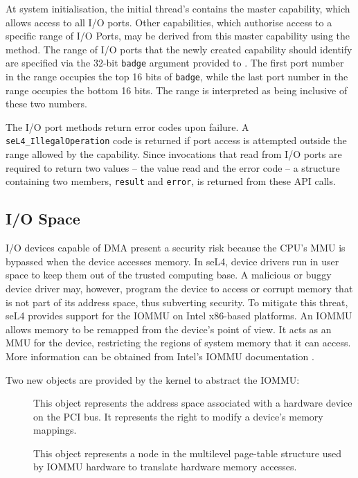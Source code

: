 At system initialisation, the initial thread's  contains the
master  capability, which allows access to all I/O ports.
Other  capabilities, which authorise access to a specific
range of I/O Ports, may be derived from this master capability using
the  method. 
The range of I/O ports that the newly created capability should identify
are specified via the 32-bit \texttt{badge} argument provided to 
. The first port number in the range
occupies the top 16 bits of \texttt{badge}, while the last port number in
the range occupies the bottom 16 bits. The range is interpreted as being
inclusive of these two numbers.

The I/O port methods return error codes upon failure.
A \texttt{seL4\_IllegalOperation} code is returned if port access is
attempted outside the range allowed by the  capability. 
Since invocations that
read from I/O ports are required to return two values -- the value read
and the error code -- a structure containing two members, \texttt{result}
and \texttt{error}, is returned from these API calls.

\subsection{I/O Space}
\label{sec:iospace}

I/O devices capable of DMA present a security risk because the CPU's MMU
is bypassed when the device accesses memory. In seL4, device drivers run
in user space to keep them out of the trusted computing base.
A malicious or buggy device driver may, however, program the device to
access or corrupt memory that is not part of its address space, thus
subverting security. To mitigate this threat, seL4 provides support for
the IOMMU on Intel x86-based platforms. An IOMMU allows memory to be
remapped from the device's point of view. It acts as an MMU for the
device, restricting the regions of system memory that it can access.
More information can be obtained from Intel's IOMMU documentation \cite{extra:vtd}.

Two new objects are provided by the kernel to abstract the IOMMU:
\begin{description}

    \item[] This object represents the address space associated
    with a hardware device on the PCI bus. It represents the right to
    modify a device's memory mappings.

    \item[] This object represents a node in the multilevel
    page-table structure used by IOMMU hardware to translate hardware
    memory accesses.

\end{description}

